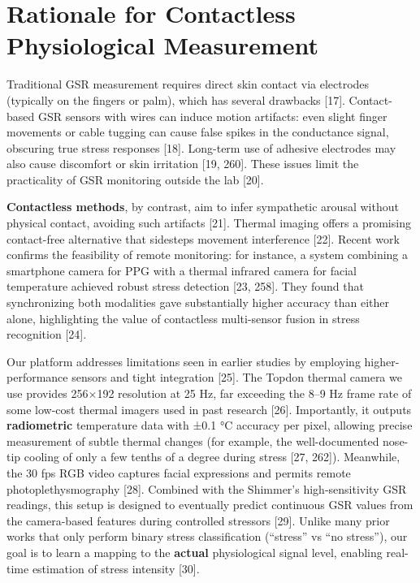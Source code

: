\documentclass{article}
\begin{document}
    \section{Rationale for Contactless Physiological Measurement}
    Traditional GSR measurement requires direct skin contact via electrodes (typically on the fingers or palm), which has several drawbacks [17]. Contact-based GSR sensors with wires can induce motion artifacts: even slight finger movements or cable tugging can cause false spikes in the conductance signal, obscuring true stress responses [18]. Long-term use of adhesive electrodes may also cause discomfort or skin irritation [19, 260]. These issues limit the practicality of GSR monitoring outside the lab [20].

    \textbf{Contactless methods}, by contrast, aim to infer sympathetic arousal without physical contact, avoiding such artifacts [21]. Thermal imaging offers a promising contact-free alternative that sidesteps movement interference [22]. Recent work confirms the feasibility of remote monitoring: for instance, a system combining a smartphone camera for PPG with a thermal infrared camera for facial temperature achieved robust stress detection [23, 258]. They found that synchronizing both modalities gave substantially higher accuracy than either alone, highlighting the value of contactless multi-sensor fusion in stress recognition [24].

    Our platform addresses limitations seen in earlier studies by employing higher-performance sensors and tight integration [25]. The Topdon thermal camera we use provides 256×192 resolution at 25 Hz, far exceeding the 8–9 Hz frame rate of some low-cost thermal imagers used in past research [26]. Importantly, it outputs \textbf{radiometric} temperature data with ±0.1 °C accuracy per pixel, allowing precise measurement of subtle thermal changes (for example, the well-documented nose-tip cooling of only a few tenths of a degree during stress [27, 262]). Meanwhile, the 30 fps RGB video captures facial expressions and permits remote photoplethysmography [28]. Combined with the Shimmer’s high-sensitivity GSR readings, this setup is designed to eventually predict continuous GSR values from the camera-based features during controlled stressors [29]. Unlike many prior works that only perform binary stress classification (“stress” vs “no stress”), our goal is to learn a mapping to the \textbf{actual} physiological signal level, enabling real-time estimation of stress intensity [30].
\end{document}
